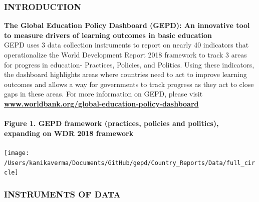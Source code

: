 \documentclass[twocolumn]{article}
\author{}
\date{\vspace{-2.5em}}
\let\oldparagraph\paragraph
\renewcommand{\paragraph}[1]{\oldparagraph{#1}\mbox{}}
\begin{document}
\newcommand{\greynote}[1]{
    {\scriptsize
    \textcolor{darkgray}{\textit{Notes:} #1}
  }
}

\newcommand{\greysource}[1]{
    {\scriptsize
    \textcolor{darkgray}{\textit{Source:} #1}
  }
}

\newcommand{\greydisclaimer}[1]{
    {\scriptsize
    \textcolor{darkgray}{\textit{Disclaimer:} #1}
  }
}

\newcommand{\greytext}[1]{
    {\scriptsize
    \textcolor{darkgray}{#1}
  }
}

\newcommand*{\tabindent}{\hspace{1mm}}

\hypertarget{introduction}{%
\subsubsection{\texorpdfstring{\textbf{INTRODUCTION}}{INTRODUCTION}}\label{introduction}}

\textbf{The Global Education Policy Dashboard (GEPD): An innovative tool
to measure drivers of learning outcomes in basic education}\\
GEPD uses 3 data collection instruments to report on nearly 40
indicators that operationalize the World Development Report 2018
framework to track 3 areas for progress in education- Practices,
Policies, and Politics. Using these indicators, the dashboard highlights
areas where countries need to act to improve learning outcomes and
allows a way for governments to track progress as they act to close gaps
in these areas. For more information on GEPD, please visit
\textbf{\href{https://www.worldbank.org/en/topic/education/brief/global-education-policy-dashboard}{www.worldbank.org/global-education-policy-dashboard}}

\hypertarget{figure-1.-gepd-framework-practices-policies-and-politics-expanding-on-wdr-2018-framework}{%
\paragraph{Figure 1. GEPD framework (practices, policies and politics),
expanding on WDR 2018
framework}\label{figure-1.-gepd-framework-practices-policies-and-politics-expanding-on-wdr-2018-framework}}

\begin{center}\texttt{[image: /Users/kanikaverma/Documents/GitHub/gepd/Country\_Reports/Data/full\_circle]} \end{center}

\hypertarget{instruments-of-data}{%
\subsubsection{\texorpdfstring{\textbf{INSTRUMENTS OF
DATA}}{INSTRUMENTS OF DATA}}\label{instruments-of-data}}
\end{document}
